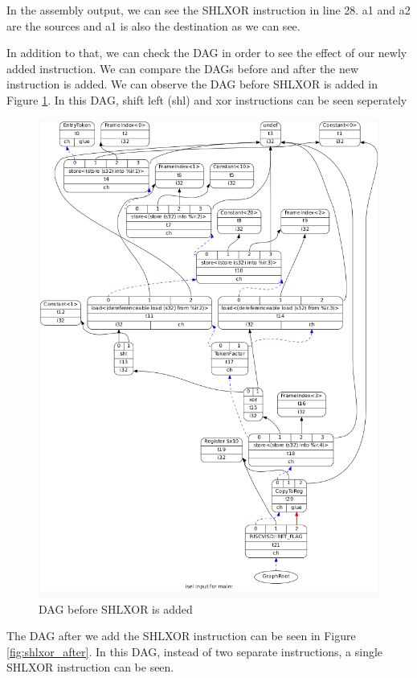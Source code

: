 In the assembly output, we can see the SHLXOR instruction in line 28. a1 and a2 are the sources and a1 is also the destination as we can see.

In addition to that, we can check the DAG in order to see the effect of our newly added instruction. We can compare the DAGs before and after the new instruction is added. We can observe the DAG before SHLXOR is added in Figure \ref{fig:shlxor_before}. In this DAG, shift left (shl) and xor instructions can be seen seperately

\begin{figure}[h!]
    \centering
    \includegraphics[scale= 0.3]{adding_new_instr/shlxor_before.png}
    \caption{DAG before SHLXOR is added}
    \label{fig:shlxor_before}
\end{figure}

The DAG after we add the SHLXOR instruction can be seen in Figure \ref{fig:shlxor_after}. In this DAG, instead of two separate instructions, a single SHLXOR instruction can be seen.

